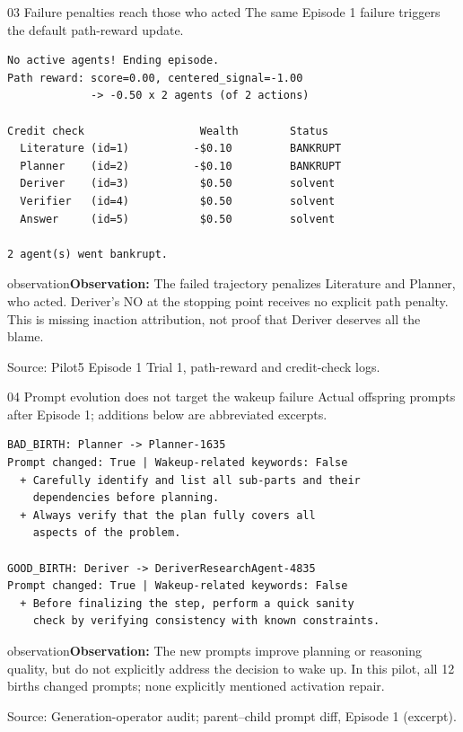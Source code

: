 \documentclass[aspectratio=169,10pt]{beamer}
\newcommand{\observation}[1]{\vspace{2mm}\begin{beamercolorbox}[rounded=true,sep=1ex,wd=\textwidth]{observation}\small\textbf{Observation:} #1\end{beamercolorbox}}
\newcommand{\source}[1]{\vfill{\tiny\textcolor{muted}{Source: #1}}}
\begin{document}
\begin{frame}[fragile]{03 \quad Failure penalties reach those who acted}
\small\textcolor{muted}{The same Episode 1 failure triggers the default path-reward update.}
\begin{lstlisting}
No active agents! Ending episode.
Path reward: score=0.00, centered_signal=-1.00
             -> -0.50 x 2 agents (of 2 actions)

Credit check                  Wealth        Status
  Literature (id=1)          -$0.10         BANKRUPT
  Planner    (id=2)          -$0.10         BANKRUPT
  Deriver    (id=3)           $0.50         solvent
  Verifier   (id=4)           $0.50         solvent
  Answer     (id=5)           $0.50         solvent

2 agent(s) went bankrupt.
\end{lstlisting}
\observation{The failed trajectory penalizes Literature and Planner, who acted. Deriver's NO at the stopping point receives no explicit path penalty. This is missing inaction attribution, not proof that Deriver deserves all the blame.}
\source{Pilot5 Episode 1 Trial 1, path-reward and credit-check logs.}
\end{frame}

\begin{frame}[fragile]{04 \quad Prompt evolution does not target the wakeup failure}
\small\textcolor{muted}{Actual offspring prompts after Episode 1; additions below are abbreviated excerpts.}
\begin{lstlisting}
BAD_BIRTH: Planner -> Planner-1635
Prompt changed: True | Wakeup-related keywords: False
  + Carefully identify and list all sub-parts and their
    dependencies before planning.
  + Always verify that the plan fully covers all
    aspects of the problem.

GOOD_BIRTH: Deriver -> DeriverResearchAgent-4835
Prompt changed: True | Wakeup-related keywords: False
  + Before finalizing the step, perform a quick sanity
    check by verifying consistency with known constraints.
\end{lstlisting}
\observation{The new prompts improve planning or reasoning quality, but do not explicitly address the decision to wake up. In this pilot, all 12 births changed prompts; none explicitly mentioned activation repair.}
\source{Generation-operator audit; parent--child prompt diff, Episode 1 (excerpt).}
\end{frame}
\end{document}
